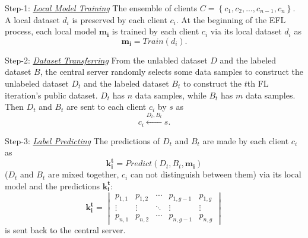 \documentclass[lettersize,journal]{IEEEtran}
\begin{document}
\par Step-1: \ul{\textit{Local Model Training}} The ensemble of clients $C=\left \{ c_{1},c_{2},...,c_{n-1},c_{n} \right \}$. A local dataset $d_i$ is preserved by each client $c_i$. At the beginning of the EFL process, each local model $\mathbf{m_i}$ is trained by each client $c_i$ via its local dataset $d_i$ as
\begin{equation}
  \mathbf{m_i}=Train(d_i).
\end{equation}
\par Step-2: \ul{\textit{Dataset Transferring}} From the unlabled dataset $D$ and the labeled dataset $B$, the central server randomly selects some data samples to construct the unlabeled dataset $D_t$ and the labeled dataset $B_t$ to construct the $t$th FL iteration's public dataset. $D_t$ has $n$ data samples, while $B_t$ has $m$ data samples. Then $D_t$ and $B_t$ are sent to each client $c_i$ by $s$ as
\begin{equation}
  c_{i} \overset{{D_{t},B_{t}}}{\leftarrow}s.
\end{equation}
\par Step-3: \ul{\textit{Label Predicting}} The predictions of $D_t$ and $B_t$ are made by each client $c_i$ as
\begin{equation}
  \mathbf{k_i^t}=Predict(D_t, B_t, \mathbf{m_i})
\end{equation}
($D_t$ and $B_t$ are mixed together, $c_i$ can not distinguish between them) via its local model and the predictions $\mathbf{k_i^t}$:
\begin{equation}
  \mathbf{k_i^t}=\begin{vmatrix}
    p_{1,1} & p_{1,2} & \cdots  & p_{1,g-1} & p_{1,g}\\ 
    \vdots  & \vdots & \ddots  & \vdots & \vdots\\ 
    p_{n,1} & p_{n,2} & \cdots  & p_{n,g-1} & p_{n,g}
    \end{vmatrix}
\end{equation}
is sent back to the central server.
\end{document}
